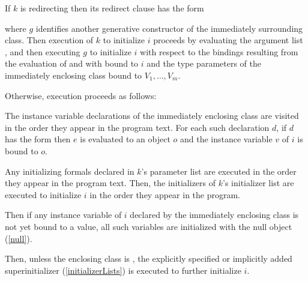 \documentclass{article}
\begin{document}
\LMHash{}
If $k$ is redirecting then its redirect clause has the form


where $g$ identifies another  generative constructor of the immediately surrounding class.
Then execution of $k$ to initialize $i$ proceeds by evaluating the argument list
,
and then executing $g$ to initialize $i$ with respect to the bindings resulting from the evaluation of
and with \THIS{} bound to $i$ and the type parameters of the immediately enclosing class bound to $V_1, \ldots, V_m$.

\LMHash{}
Otherwise, execution proceeds as follows:

\LMHash{}
The instance variable declarations of the immediately enclosing class are visited in the order they appear in the program text.
For each such declaration $d$, if $d$ has the form 
then $e$ is evaluated to an object $o$
and the instance variable $v$ of $i$ is bound to $o$.

\LMHash{}
Any initializing formals declared in $k$'s parameter list are executed in the order they appear in the program text.
Then, the initializers of $k$'s initializer list are executed to initialize $i$
in the order they appear in the program.


\LMHash{}
Then if any instance variable of $i$ declared by the immediately enclosing class
is not yet bound to a value,
all such variables are initialized with the null object (\ref{null}).

\LMHash{}
Then, unless the enclosing class is , the explicitly specified or
implicitly added superinitializer (\ref{initializerLists}) is executed to
further initialize $i$.

\end{document}
